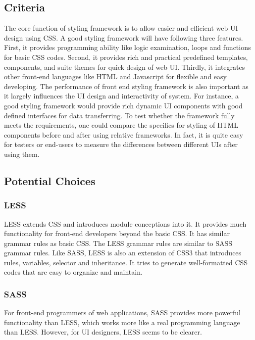 \documentclass[letterpaper,10pt]{article}
\begin{document}
	\subsection{Criteria}
  The core function of styling framework is to allow easier and efficient web UI design using CSS. A good styling framework will have following three features. First, it provides programming ability like logic examination, loops and functions for basic CSS codes. Second, it provides rich and practical predefined templates, components, and suite themes for quick design of web UI. Thirdly, it integrates other front-end languages like HTML and Javascript for flexible and easy developing.
  The performance of front end styling framework is also important as it largely influences the UI design and interactivity of system. For instance, a good styling framework would provide rich dynamic UI components with good defined interfaces for data transferring. To test whether the framework fully meets the requirements, one could compare the specifics for styling of HTML components before and after using relative frameworks. In fact, it is quite easy for testers or end-users to measure the differences between different UIs after using them.

	\subsection{Potential Choices}
		\subsubsection{LESS}
        LESS extends CSS and introduces module conceptions into it. It provides much functionality for front-end developers beyond the basic CSS. It has similar grammar rules as basic CSS. The LESS grammar rules are similar to SASS grammar rules. Like SASS, LESS is also an extension of CSS3 that introduces rules, variables, selector and inheritance. It tries to generate well-formatted CSS codes that are easy to organize and maintain.

		\subsubsection{SASS}
        For front-end programmers of web applications, SASS provides more powerful functionality than LESS, which works more like a real programming language than LESS. However, for UI designers, LESS seems to be clearer.
\end{document}
